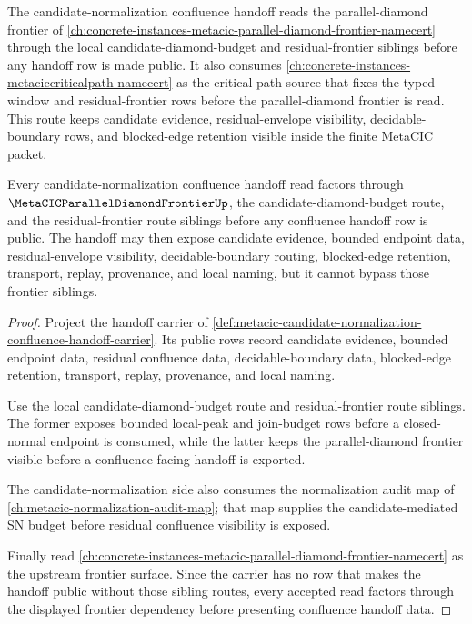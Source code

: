 The candidate-normalization confluence handoff reads the parallel-diamond frontier of \autoref{ch:concrete-instances-metacic-parallel-diamond-frontier-namecert} through the local candidate-diamond-budget and residual-frontier siblings before any handoff row is made public. It also consumes \autoref{ch:concrete-instances-metaciccriticalpath-namecert} as the critical-path source that fixes the typed-window and residual-frontier rows before the parallel-diamond frontier is read. This route keeps candidate evidence, residual-envelope visibility, decidable-boundary rows, and blocked-edge retention visible inside the finite MetaCIC packet.

\begin{theorem}
\label{thm:metacic-candidate-normalization-handoff-obligations}
Every candidate-normalization confluence handoff read factors through $\MetaCICParallelDiamondFrontierUp$, the candidate-diamond-budget route, and the residual-frontier route siblings before any confluence handoff row is public. The handoff may then expose candidate evidence, bounded endpoint data, residual-envelope visibility, decidable-boundary routing, blocked-edge retention, transport, replay, provenance, and local naming, but it cannot bypass those frontier siblings.
\end{theorem}
\begin{proof}
Project the handoff carrier of \autoref{def:metacic-candidate-normalization-confluence-handoff-carrier}. Its public rows record candidate evidence, bounded endpoint data, residual confluence data, decidable-boundary data, blocked-edge retention, transport, replay, provenance, and local naming.

Use the local candidate-diamond-budget route and residual-frontier route siblings. The former exposes bounded local-peak and join-budget rows before a closed-normal endpoint is consumed, while the latter keeps the parallel-diamond frontier visible before a confluence-facing handoff is exported.

The candidate-normalization side also consumes the normalization audit map of \autoref{ch:metacic-normalization-audit-map}; that map supplies the candidate-mediated SN budget before residual confluence visibility is exposed.

Finally read \autoref{ch:concrete-instances-metacic-parallel-diamond-frontier-namecert} as the upstream frontier surface. Since the carrier has no row that makes the handoff public without those sibling routes, every accepted read factors through the displayed frontier dependency before presenting confluence handoff data.
\end{proof}
